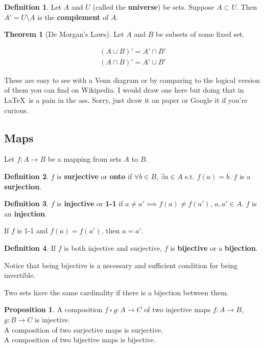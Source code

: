 \documentclass{article}
\theoremstyle{definition}
\newtheorem{definition}{Definition}[section]
\newtheorem{proposition}{Proposition}[section]
\newtheorem{theorem}{Theorem}[section]
\begin{document}
\begin{definition}
Let $A$ and $U$ (called the \textbf{universe}) be sets. Suppose $A \subset U$. Then $A' = U \setminus A$ is the \textbf{complement} of $A$.
\end{definition}

\begin{theorem}[De Morgan's Laws]
Let $A$ and $B$ be subsets of some fixed set.

\begin{align}
(A \cup B)' = A' \cap B' \\
(A \cap B)' = A' \cup B'
\end{align}
\end{theorem}

These are easy to see with a Venn diagram or by comparing to the logical version of them you can find on Wikipedia. I would draw one here but doing that in \LaTeX \ is a pain in the ass. Sorry, just draw it on paper or Google it if you're curious.

\subsection{Maps}

Let $f: A \rightarrow B$ be a mapping from sets $A$ to $B$.

\begin{definition}
$f$ is \textbf{surjective} or \textbf{onto} if $\forall b \in B$, $\exists a \in A$ s.t. $f(a) = b$. $f$ is a \textbf{surjection}.
\end{definition}

\begin{definition}
$f$ is \textbf{injective} or \textbf{1-1} if $a \neq a' \implies f(a) \neq f(a')$, $a, a' \in A$. $f$ is an \textbf{injection}.
\end{definition}

If $f$ is 1-1 and $f(a) = f(a')$, then $a = a'$.

\begin{definition}
If $f$ is both injective and surjective, $f$ is \textbf{bijective} or a \textbf{bijection}.
\end{definition}

Notice that being bijective is a necessary and sufficient condition for being invertible.

Two sets have the same cardinality if there is a bijection between them.

\begin{proposition}
A composition $f \circ g : A \rightarrow C $ of two injective maps $f : A \rightarrow B$, $g: B \rightarrow C$ is injective. \\
A composition of two surjective maps is surjective. \\
A composition of two bijective maps is bijective.
\end{proposition}
\end{document}
